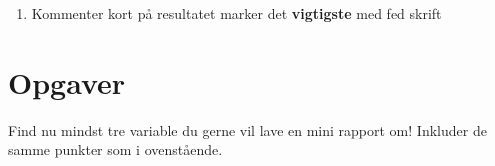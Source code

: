 \documentclass[
  12pt,
]{article}
\providecommand{\tightlist}{%
  \setlength{\itemsep}{0pt}\setlength{\parskip}{0pt}}
\begin{document}
\begin{enumerate}
\def\labelenumi{\arabic{enumi}.}
\setcounter{enumi}{2}
\tightlist
\item
  Kommenter kort på resultatet marker det \textbf{vigtigste} med fed
  skrift
\end{enumerate}

\hypertarget{opgaver}{%
\section{Opgaver}\label{opgaver}}

Find nu mindst tre variable du gerne vil lave en mini rapport om!
Inkluder de samme punkter som i ovenstående.

  
\end{document}
